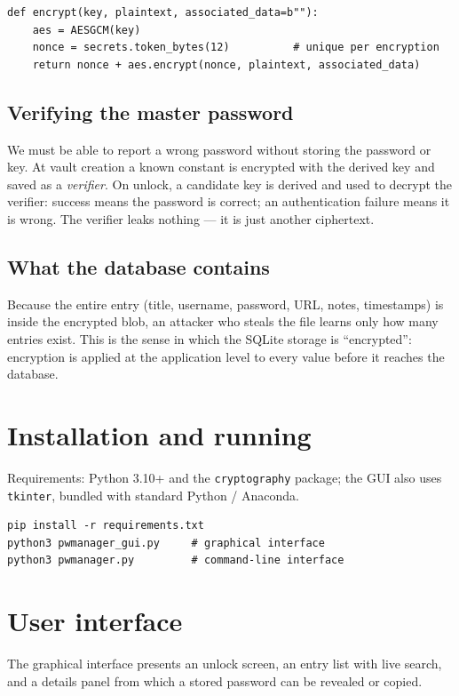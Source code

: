 \documentclass[11pt,a4paper]{article}
\begin{document}
\begin{lstlisting}[style=py,caption={Authenticated encryption; a unique nonce per call.}]
def encrypt(key, plaintext, associated_data=b""):
    aes = AESGCM(key)
    nonce = secrets.token_bytes(12)          # unique per encryption
    return nonce + aes.encrypt(nonce, plaintext, associated_data)
\end{lstlisting}

\subsection{Verifying the master password}
We must be able to report a wrong password without storing the password or key.
At vault creation a known constant is encrypted with the derived key and saved
as a \emph{verifier}. On unlock, a candidate key is derived and used to decrypt
the verifier: success means the password is correct; an authentication failure
means it is wrong. The verifier leaks nothing --- it is just another ciphertext.

\subsection{What the database contains}
Because the entire entry (title, username, password, URL, notes, timestamps) is
inside the encrypted blob, an attacker who steals the file learns only how many
entries exist. This is the sense in which the SQLite storage is ``encrypted'':
encryption is applied at the application level to every value before it reaches
the database.

\section{Installation and running}
Requirements: Python 3.10+ and the \texttt{cryptography} package; the GUI also
uses \texttt{tkinter}, bundled with standard Python / Anaconda.

\begin{lstlisting}[style=py,caption={Running the application.}]
pip install -r requirements.txt
python3 pwmanager_gui.py     # graphical interface
python3 pwmanager.py         # command-line interface
\end{lstlisting}

\section{User interface}
The graphical interface presents an unlock screen, an entry list with live
search, and a details panel from which a stored password can be revealed or
copied.
\end{document}
